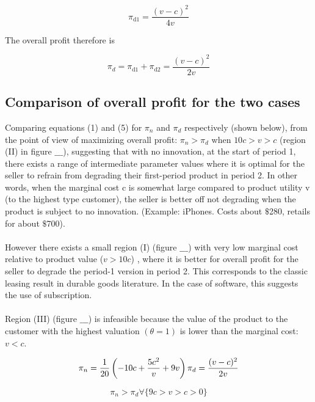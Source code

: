 \documentclass{article}
\begin{document}
\begin{equation}
\pi _{\text{d1}}=\frac{(v-c)^2}{4 v}
\end{equation}

The overall profit therefore is 

\begin{equation}
\pi _d =\pi _{\text{d1}}+\pi _{\text{d2}}=\frac{(v-c)^2}{2 v}
\end{equation}

\subsection*{Comparison of overall profit for the two cases}

Comparing equations (1) and { }(5) for \(\pi _n\) and \(\pi _d\) respectively (shown below), from the point of view of maximizing overall profit:
\(\pi _n>\pi _d\) when \(10 c>v>c\) (region (II) in figure $\_\_\_$), suggesting that with no innovation, at the start of period 1, there exists
a range of intermediate parameter values where it is optimal for the seller to refrain from degrading their first-period product in period 2. In
other words, when the marginal cost c is somewhat large compared to product utility v (to the highest type customer), the seller is { }better off
not degrading when the product is subject to no innovation. (Example: iPhones. Costs about $\$$280, retails for about $\$$700). \\
\\
However there exists a small region (I) (figure $\_\_\_$) with very low marginal cost relative to product value (\(v>10 c\)) , where it is better
for overall profit for the seller to degrade the period-1 version in period 2. This corresponds to the classic leasing result in durable goods literature.
In the case of software, this suggests the use of subscription.\\
\\
Region (III) (figure $\_\_\_$) is infeasible because the value of the product to the customer with the highest valuation \((\theta =1)\) is lower
than the marginal cost: \(v<c\).

\[\pi _n=\frac{1}{20} \left(-10 c+\frac{5 c^2}{v}+9 v\right)\\
\\
\pi _d =\frac{(v-c)^2}{2 v}\]

\begin{equation}
\pi _n>\pi _d \forall \{9 c> v>c>0\}
\end{equation}
\end{document}
